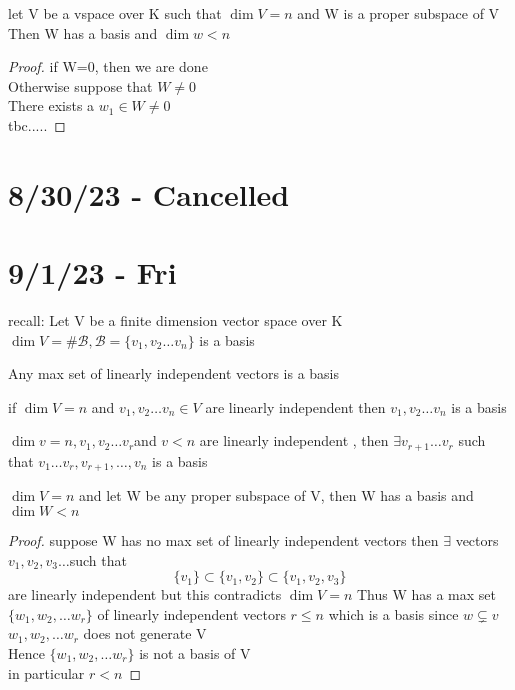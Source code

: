 \documentclass{article}
\newcommand{\vs}{v_1,v_2\dots v_n}
\newcommand{\sr}[1]{#1_1,#1_2,\dots #1_r}
\newcommand{\fb}{\mathcal{B}}
\newcommand{\brac}[1]{\{#1\}}
\newcommand{\li}{linearly independent }
\newenvironment{corollary}[2][Corollary]{\begin{trivlist}
\item[\hskip \labelsep {\bfseries #1}\hskip \labelsep {\bfseries #2.}]}{\end{trivlist}}
\begin{document}
\begin{theorem}
    [D] let V be a vspace over K such that $\dim V=n$ and W is a proper subspace of V\\Then W has a basis and $\dim w<n$
    
\end{theorem}
\begin{proof}
    if W=0, then we are done\\
    Otherwise suppose that $W \neq 0$ \\There exists a $w_1\in W \neq 0$ \\
    tbc.....
\end{proof}



\section{8/30/23 - Cancelled}


\section{9/1/23 - Fri}

recall: Let V be a finite dimension vector space over K\\
$\dim V = \# \mathcal{B} , \fb =\brac{\vs}$ is a basis\\
\begin{theorem}
    Any max set of \li vectors is a basis
\end{theorem}
\begin{theorem}
    if $\dim V=n$ and $\vs \in V$ are \li then $\vs$ is a basis
\end{theorem}
\begin{corollary}
i $\dim v=n, v_1,v_2\dots v_r$and $v<n$ are \li, then $\exists v_{r+1}\dots v_r$ such that $v_1\dots v_r,v_{r+1},\dots, v_n$ is a basis
\end{corollary}
\begin{theorem}
$\dim V=n$ and let W be any proper subspace of V, then W has a basis and $\dim W<n$
\end{theorem}
\begin{proof}
    suppose W has no max set of \li vectors then $\exists$ vectors $v_1,v_2,v_3\dots $such that $$\brac{v_1}\subset \brac{v_1,v_2}\subset \brac{v_1,v_2,v_3}$$ are \li but this contradicts $\dim V=n$ \lightning
    Thus W has a max set $\brac{\sr{w}}$ of \li vectors $r \leq n$ which is a basis since $w \subsetneq v$ $\sr{w}$ does not generate V
    \\Hence $\brac{\sr{w}}$ is not a basis of V\\
    in particular $r<n$
\end{proof}
\end{document}
